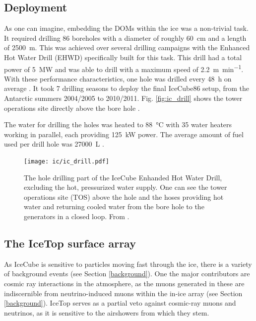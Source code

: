 \documentclass[
    a4paper, %
    fontsize=10pt, %
    twoside=false, %
    numbers=noenddot, %
    fontmethod=tex,
]{kaobook}
\begin{document}
\subsection{Deployment} 
As one can imagine, embedding the DOMs within the ice was a non-trivial task. It required drilling 86 boreholes with a diameter of roughly \SI{60}{\cm} and a length of \SI{2500}{\m}. This was achieved over several drilling campaigns with the Enhanced Hot Water Drill (EHWD) specifically built for this task. This drill had a total power of \SI{5}{\mega\W} and was able to drill with a maximum speed of \SI{2.2}{\meter\per\minute}. With these performance characteristics, one hole was drilled every \SI{48}{\hour} on average \cite{Aartsen2017}. It took 7 drilling seasons to deploy the final IceCube86 setup, from the Antarctic summers 2004/2005 to 2010/2011. Fig. \ref{fig:ic_drill} shows the tower operations site directly above the bore hole .

The water for drilling the holes was heated to \SI{88}{\celsius} with 35 water heaters working in parallel, each providing \SI{125}{\kilo\W} power. The average amount of fuel used per drill hole was \SI{27000}{\liter} \cite{Benson2014}. 

\begin{figure}[]
    \texttt{[image: ic/ic\_drill.pdf]}
    \caption[IceCube enhanced hot water drill]{The hole drilling part of the IceCube Enhanded Hot Water Drill, excluding the hot, pressurized water supply. One can see the tower operations site (TOS) above the hole and the hoses providing hot water and returning cooled water from the bore hole to the generators in a closed loop. From \cite{Benson2014}.}
\end{figure}

\subsection{The IceTop surface array}
As IceCube is sensitive to particles moving fast through the ice, there is a variety of background events (see Section \ref{background}). One the major contributors are cosmic ray interactions in the atmosphere, as the muons generated in these are indiscernible from neutrino-induced muons within the in-ice array (see Section \ref{background}). IceTop serves as a partial veto against cosmic-ray muons and neutrinos, as it is sensitive to the airshowers from which they stem.
\end{document}
